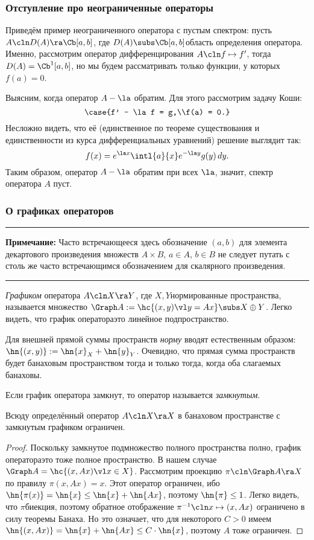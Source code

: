 \documentclass[a4paper]{article}
\newcommand{\comment}[1]{\par\vskip2pt\hrule\vskip2pt{\footnotesize \textbf{Примечание:} #1\par}\vskip2pt\hrule\vskip2pt}
\begin{document}
\subsubsection{Отступление про неограниченные операторы}

Приведём пример неограниченного оператора с пустым спектром:
пусть $A\cln D(A) \ra \Cb[a,b]$, где $D(A) \subs \Cb[a,b]$\т область
определения оператора. Именно, рассмотрим оператор дифференцирования $A\cln f \mapsto f'$,
тогда $D(A) = \Cb^1[a,b]$, но мы будем рассматривать только функции, у которых $f(a) = 0$.

Выясним, когда оператор $A - \la$ обратим. Для этого рассмотрим задачу Коши:
$$
\case{f' - \la f = g,\\f(a) = 0.}
$$
Несложно видеть, что её (единственное по теореме существования и
единственности из курса дифференциальных уравнений)
решение выглядит так:
$$f(x) = e^{\la x}\intl{a}{x}e^{-\la y} g(y)\,dy.$$
Таким образом, оператор $A-\la$ обратим при всех $\la$, значит, спектр оператора $A$ пуст.

\subsubsection{О графиках операторов}
\comment{Часто встречающееся здесь обозначение $(a,b)$ для элемента декартового произведения множеств
$A \times B$, $a \in A$, $b \in B$ не следует путать с столь же часто встречающимся обозначением для
скалярного произведения.}

\begin{df}
\emph{Графиком} оператора $A\cln X \ra Y$, где $X, Y$\т нормированные пространства, называется множество
$\Graph A := \hc{(x,y) \vl y = Ax} \subs X \oplus Y$. Легко видеть, что график оператора\т это линейное
подпространство.
\end{df}

Для внешней прямой суммы пространств \emph{норму} вводят естественным образом: $\hn{(x,y)} := \hn{x}_X + \hn{y}_Y$.
Очевидно, что прямая сумма пространств будет банаховым пространством тогда и только тогда,
когда оба слагаемых банаховы.

\begin{df}
Если график оператора замкнут, то оператор называется \emph{замкнутым}.
\end{df}

\begin{stm}
Всюду определённый оператор $A\cln X \ra X$ в банаховом пространстве с замкнутым графиком ограничен.
\end{stm}
\begin{proof}
Поскольку замкнутое подмножество полного пространства полно, график оператора\т это
тоже полное пространство. В нашем случае $\Graph A  = \hc{(x, Ax) \vl x \in X}$.
Рассмотрим проекцию $\pi\cln \Graph A \ra X$ по правилу $\pi(x,Ax) = x$. Этот
оператор ограничен, ибо $\hn{\pi(x)} = \hn{x} \le \hn{x} + \hn{Ax}$,
поэтому $\hn{\pi} \le 1$.
Легко видеть, что $\pi$\т биекция, поэтому обратное отображение $\pi^{-1}\cln x \mapsto (x,Ax)$
ограничено в силу теоремы Банаха. Но это означает, что для некоторого $C> 0$ имеем
$\hn{(x,Ax)} = \hn{x} + \hn{Ax} \le C\cdot \hn{x}$, поэтому $A$ тоже ограничен.
\end{proof}
\end{document}

